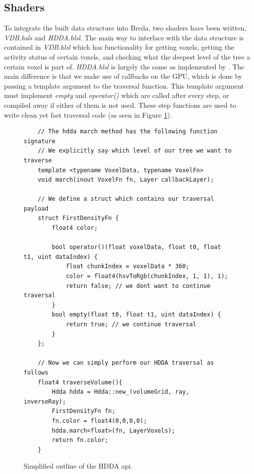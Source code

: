 \subsection{Shaders} \label{implementation:shaders}
To integrate the built data structure into Breda, two shaders have been written, \textit{VDB.hsls} and \textit{HDDA.hlsl}. The main way to interface with the data structure is contained in \textit{VDB.hlsl} which has functionality for getting voxels, getting the activity status of certain voxels, and checking what the deepest level of the tree a certain voxel is part of. \textit{HDDA.hlsl} is largely the same as implemented by \cite{museth2013vdb}. The main difference is that we make use of callbacks on the GPU, which is done by passing a template argument to the traversal function. This template argument must implement \textit{empty} and \textit{operator()} which are called after every step, or compiled away if either of them is not used. These step functions are used to write clean yet fast traversal code (as seen in Figure \ref{implementation:hdda_sample}).


\begin{figure}
    \begin{lstlisting}
    // The hdda march method has the following function signature
    // We explicitly say which level of our tree we want to traverse
    template <typename VoxelData, typename VoxelFn>
    void march(inout VoxelFn fn, Layer callbackLayer);

    // We define a struct which contains our traversal payload
    struct FirstDensityFn {
        float4 color;
    
        bool operator()(float voxelData, float t0, float t1, uint dataIndex) {
            float chunkIndex = voxelData * 360;
            color = float4(hsvToRgb(chunkIndex, 1, 1), 1);
            return false; // we dont want to continue traversal
        }
        bool empty(float t0, float t1, uint dataIndex) { 
            return true; // we continue traversal
        }
    };

    // Now we can simply perform our HDDA traversal as follows
    float4 traverseVolume(){
        Hdda hdda = Hdda::new_(volumeGrid, ray, inverseRay);
        FirstDensityFn fn;
        fn.color = float4(0,0,0,0);
        hdda.march<float>(fn, LayerVoxels); 
        return fn.color;
    }
\end{lstlisting}
    \caption{Simplified outline of the HDDA api.}\label{implementation:hdda_sample}
\end{figure}


